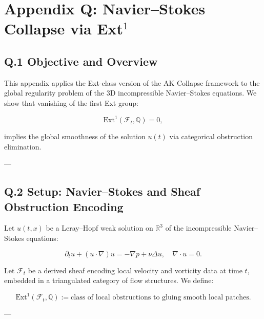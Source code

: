 \documentclass[11pt]{article}
\begin{document}

\section*{Appendix Q: Navier–Stokes Collapse via Ext$^1$}

\subsection*{Q.1 Objective and Overview}

This appendix applies the Ext-class version of the AK Collapse framework to the global regularity problem of the 3D incompressible Navier–Stokes equations.  
We show that vanishing of the first Ext group:

\[
\mathrm{Ext}^1(\mathcal{F}_t, \mathbb{Q}) = 0,
\]

implies the global smoothness of the solution $u(t)$ via categorical obstruction elimination.

---

\subsection*{Q.2 Setup: Navier–Stokes and Sheaf Obstruction Encoding}

Let $u(t,x)$ be a Leray–Hopf weak solution on $\mathbb{R}^3$ of the incompressible Navier–Stokes equations:

\[
\partial_t u + (u \cdot \nabla)u = -\nabla p + \nu \Delta u, \quad \nabla \cdot u = 0.
\]

Let $\mathcal{F}_t$ be a derived sheaf encoding local velocity and vorticity data at time $t$, embedded in a triangulated category of flow structures. We define:

\[
\mathrm{Ext}^1(\mathcal{F}_t, \mathbb{Q}) := \text{class of local obstructions to gluing smooth local patches}.
\]

---
\end{document}
